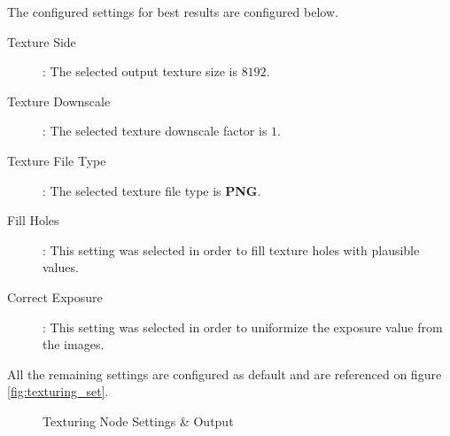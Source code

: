 \documentclass[12pt]{report}
\begin{document}
The configured settings for best results are configured below.
\begin{description}
  \item[Texture Side]: The selected output texture size is $8192$.
  \item[Texture Downscale]: The selected texture downscale factor is $1$.
  \item[Texture File Type]: The selected texture file type is \textbf{PNG}.  
  \item[Fill Holes]: This setting was selected in order to fill texture holes with plausible values.
  \item[Correct Exposure]: This setting was selected in order to uniformize the exposure value from the images.  
\end{description}



All the remaining settings are configured as default and are referenced on figure \ref{fig:texturing_set}.
\begin{figure}[H]%
  \centering
  \qquad
\caption{Texturing Node Settings \& Output}
\label{fig:Texturing_settings} 
\end{figure}
\end{document}

